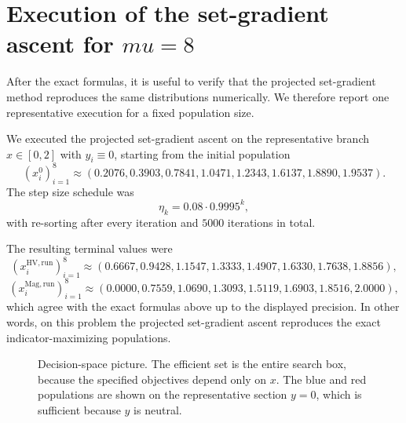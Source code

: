 \documentclass{article}
\def\mu{mu}%
\theoremstyle{definition}
\newcommand{\1}{\mathbf{1}}
\begin{document}
\section{Execution of the set-gradient ascent for \texorpdfstring{$\mu=8$}{mu=8}}

After the exact formulas, it is useful to verify that the projected set-gradient method reproduces the same distributions numerically. We therefore report one representative execution for a fixed population size.

We executed the projected set-gradient ascent on the representative branch $x\in[0,2]$ with $y_i\equiv0$, starting from the initial population
\[
(x_i^0)_{i=1}^8\approx(0.2076,0.3903,0.7841,1.0471,1.2343,1.6137,1.8890,1.9537).
\]
The step size schedule was
\[
\eta_k=0.08\cdot 0.9995^k,
\]
with re-sorting after every iteration and $5000$ iterations in total.

The resulting terminal values were
\[
(x_i^{\mathrm{HV,run}})_{i=1}^8\approx(0.6667,0.9428,1.1547,1.3333,1.4907,1.6330,1.7638,1.8856),
\]
\[
(x_i^{\mathrm{Mag,run}})_{i=1}^8\approx(0.0000,0.7559,1.0690,1.3093,1.5119,1.6903,1.8516,2.0000),
\]
which agree with the exact formulas above up to the displayed precision. In other words, on this problem the projected set-gradient ascent reproduces the exact indicator-maximizing populations.

\begin{figure}[p]
\centering
{}
\caption{Decision-space picture. The efficient set is the entire search box, because the specified objectives depend only on $x$. The blue and red populations are shown on the representative section $y=0$, which is sufficient because $y$ is neutral.}
\label{fig:decision}
\end{figure}
\end{document}
